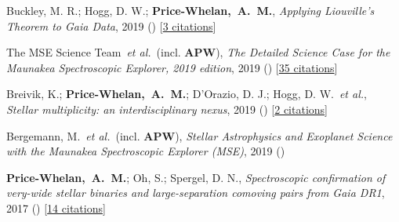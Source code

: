 \item[{\color{deemph}\scriptsize5}]Buckley, M. R.; Hogg, D. W.; \textbf{Price-Whelan,~A.~M.}, \textit{Applying Liouville's Theorem to Gaia Data}, 2019 () [\href{http://adsabs.harvard.edu/abs/2019arXiv190700987B}{3 citations}]

\item[{\color{deemph}\scriptsize4}]The MSE Science Team~\textit{et al.}~(incl. \textbf{APW}), \textit{The Detailed Science Case for the Maunakea Spectroscopic Explorer, 2019 edition}, 2019 () [\href{http://adsabs.harvard.edu/abs/2019arXiv190404907T}{35 citations}]

\item[{\color{deemph}\scriptsize3}]Breivik, K.; \textbf{Price-Whelan,~A.~M.}; D'Orazio, D. J.; Hogg, D. W.~\textit{et al.}, \textit{Stellar multiplicity: an interdisciplinary nexus}, 2019 () [\href{http://adsabs.harvard.edu/abs/2019arXiv190305094B}{2 citations}]

\item[{\color{deemph}\scriptsize2}]Bergemann, M.~\textit{et al.}~(incl. \textbf{APW}), \textit{Stellar Astrophysics and Exoplanet Science with the Maunakea Spectroscopic Explorer (MSE)}, 2019 ()

\item[{\color{deemph}\scriptsize1}]\textbf{Price-Whelan,~A.~M.}; Oh, S.; Spergel, D. N., \textit{Spectroscopic confirmation of very-wide stellar binaries and large-separation comoving pairs from Gaia DR1}, 2017 () [\href{http://adsabs.harvard.edu/abs/2017arXiv170903532P}{14 citations}]